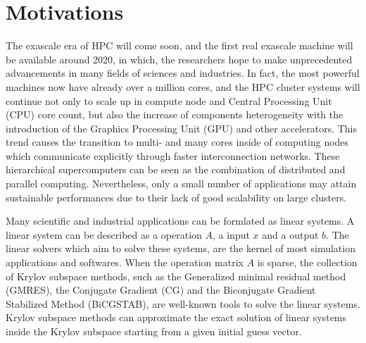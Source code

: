 \section{Motivations}

The exascale era of HPC will come soon, and the first real exascale machine will be available around 2020, in which, the researchers hope to make unprecedented advancements in many fields of sciences and industries. In fact, the most powerful machines now have already over a million cores, and the HPC cluster systems will continue not only to scale up in compute node and Central Processing Unit (CPU) core count, but also the increase of components heterogeneity with the introduction of the Graphics Processing Unit (GPU) and other accelerators. This trend causes the transition to multi- and many cores inside of computing nodes which communicate explicitly through faster interconnection networks. These hierarchical supercomputers can be seen as the combination of distributed and parallel computing. Nevertheless, only a small number of applications may attain sustainable performances due to their lack of good scalability on large clusters. 

Many scientific and industrial applications can be formlated as linear systems. A linear system can be described as a operation $A$, a input $x$ and a output $b$. The linear solvers which aim to solve these systems, are the kernel of most simulation applications and softwares. When the operation matrix $A$ is sparse, the collection of Krylov subspace methods, such as the Generalized minimal residual method (GMRES), the Conjugate Gradient (CG)  and the Biconjugate Gradient Stabilized Method (BiCGSTAB), are well-known tools to solve the linear systems. Krylov subspace methods can approximate the exact solution of linear systems inside the Krylov subspace starting from a given initial guess vector. 

